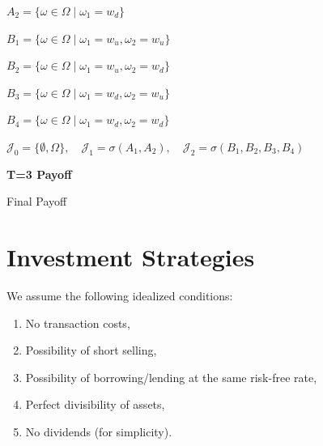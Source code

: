 $A_2 = \{\omega \in \Omega \mid \omega_1 = w_d\}$

$B_1 = \{\omega \in \Omega \mid \omega_1 = w_u, \omega_2 = w_u\}$

$B_2 = \{\omega \in \Omega \mid \omega_1 = w_u, \omega_2 = w_d\}$

$B_3 = \{\omega \in \Omega \mid \omega_1 = w_d, \omega_2 = w_u\}$

$B_4 = \{\omega \in \Omega \mid \omega_1 = w_d, \omega_2 = w_d\}$

\vspace{0.5cm}

$\mathcal{J}_0 = \{\emptyset, \Omega\}, \quad \mathcal{J}_1 = \sigma(A_1, A_2), \quad \mathcal{J}_2 = \sigma(B_1, B_2, B_3, B_4)$

\vspace{1cm}

\noindent \textbf{T=3 Payoff}

\noindent Final Payoff

\section{Investment Strategies}

\begin{assumption}
We assume the following idealized conditions:
\begin{enumerate}
\item No transaction costs,
\item Possibility of short selling,
\item Possibility of borrowing/lending at the same risk-free rate,
\item Perfect divisibility of assets,
\item No dividends (for simplicity).
\end{enumerate}
\end{assumption}





